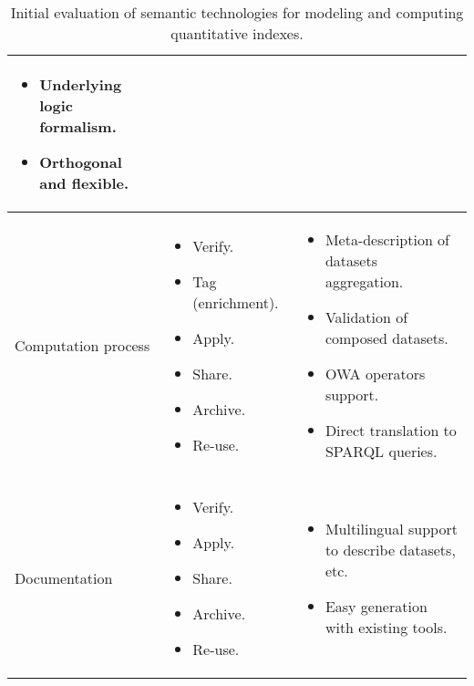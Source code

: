 \begin{table}[!htb]
\begin{center}
\begin{tabular}{|p{3cm}|p{3.5cm}|p{6.5cm}|}
\begin{itemize}
                  \item Underlying logic formalism.                  
                  \item Orthogonal and flexible.                 
                 \end{itemize} \\ \hline  
  Computation process &  \begin{itemize} \item Verify. \item Tag (enrichment). \item Apply. \item Share. \item Archive. \item Re-use. \end{itemize} & \begin{itemize}
                  \item Meta-description of datasets aggregation.
                  \item Validation of composed datasets.
                  \item OWA operators support.
                  \item Direct translation to SPARQL queries.  
                 \end{itemize} \\ \hline
  Documentation & \begin{itemize} \item Verify. \item Apply. \item Share. \item Archive. \item Re-use. \end{itemize} &\begin{itemize}
                  \item Multilingual support to describe datasets, etc.
                  \item Easy generation with existing tools.                
                 \end{itemize} \\ \hline               
       
  \hline
  \end{tabular}
  \caption{Initial evaluation of semantic technologies for modeling and computing quantitative indexes.}
  \label{tab:eval-rdfindex}
  \end{center}
\end{table} 



